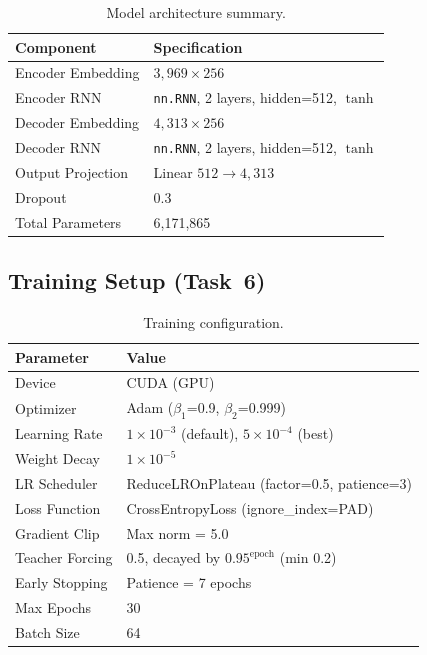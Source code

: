 \documentclass[runningheads]{llncs}
\begin{document}
\begin{table}[H]
\centering
\caption{Model architecture summary.}
\label{tab:arch}
\begin{tabular}{@{}ll@{}}
\toprule
\textbf{Component} & \textbf{Specification} \\
\midrule
Encoder Embedding  & $3{,}969 \times 256$ \\
Encoder RNN        & \texttt{nn.RNN}, 2 layers, hidden=512, $\tanh$ \\
Decoder Embedding  & $4{,}313 \times 256$ \\
Decoder RNN        & \texttt{nn.RNN}, 2 layers, hidden=512, $\tanh$ \\
Output Projection  & Linear $512 \to 4{,}313$ \\
Dropout            & 0.3 \\
Total Parameters   & 6,171,865 \\
\bottomrule
\end{tabular}
\end{table}

\subsection{Training Setup (Task~6)}

\begin{table}[H]
\centering
\caption{Training configuration.}
\label{tab:training}
\begin{tabular}{@{}ll@{}}
\toprule
\textbf{Parameter} & \textbf{Value} \\
\midrule
Device          & CUDA (GPU) \\
Optimizer       & Adam ($\beta_1$=0.9, $\beta_2$=0.999) \\
Learning Rate   & $1 \times 10^{-3}$ (default), $5 \times 10^{-4}$ (best) \\
Weight Decay    & $1 \times 10^{-5}$ \\
LR Scheduler    & ReduceLROnPlateau (factor=0.5, patience=3) \\
Loss Function   & CrossEntropyLoss (ignore\_index=PAD) \\
Gradient Clip   & Max norm = 5.0 \\
Teacher Forcing & 0.5, decayed by $0.95^{\text{epoch}}$ (min 0.2) \\
Early Stopping  & Patience = 7 epochs \\
Max Epochs      & 30 \\
Batch Size      & 64 \\
\bottomrule
\end{tabular}
\end{table}
\end{document}
